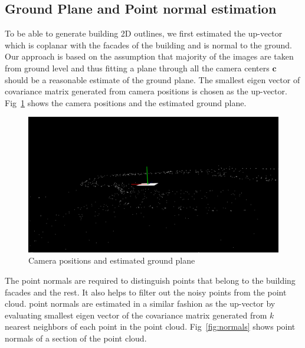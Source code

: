 \documentclass[10pt,twocolumn,letterpaper]{article}
\begin{document}
\subsection{Ground Plane and Point normal estimation}
To be able to generate building 2D outlines, we first estimated the up-vector which is coplanar with the facades of the building and is normal to the ground. Our approach is based on the assumption that majority of the images are taken from ground level and thus fitting a plane through all the camera centers $\textbf{c}$ should be a reasonable estimate of the ground plane. The smallest eigen vector of covariance matrix generated from camera positions is chosen as the up-vector. Fig~\ref{fig:ground} shows the camera positions and the estimated ground plane.

\begin{figure}[h]
   \centering
   \includegraphics[width=\linewidth]{images/ground_plane.png}
   \caption{Camera positions and estimated ground plane}
   \label{fig:ground}
\end{figure}

The point normals are required to distinguish points that belong to the building facades and the rest. It also helps to filter out the noisy points from the point cloud. point normals are estimated in a similar fashion as the up-vector by evaluating smallest eigen vector of the covariance matrix generated from $\textit{k}$ nearest neighbors of each point in the point cloud. Fig~\ref{fig:normals} shows point normals of a section of the point cloud.
\end{document}

